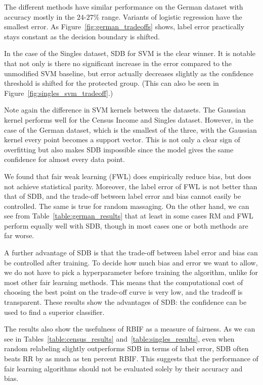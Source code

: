 \documentclass[conference]{IEEEtran}
\begin{document}
The different methods have similar performance on the German dataset with
accuracy mostly in the $24$-$27\%$ range. Variants of logistic regression have
the smallest error. As Figure~\ref{fig:german_tradeoffs} shows, label error
practically stays constant as the decision boundary is shifted.

In the case of the Singles dataset, SDB for SVM is the clear winner. It is
notable that not only is there no significant increase in the error compared to
the unmodified SVM baseline, but error actually decreases slightly as the
confidence threshold is shifted for the protected group. (This can also be seen
in Figure~\ref{fig:singles_svm_tradeoff}.)

Note again the difference in SVM kernels between the datasets.  The Gaussian
kernel performs well for the Census Income and Singles dataset.  However, in
the case of the German dataset, which is the smallest of the three, with the
Gaussian kernel every point becomes a support vector. This is not only a clear
sign of overfitting but also makes SDB impossible since the model gives the
same confidence for almost every data point.

We found that fair weak learning (FWL) does empirically reduce bias, but does
not achieve statistical parity.  Moreover, the label error of FWL is not better
than that of SDB, and the trade-off between label error and bias cannot easily
be controlled. The same is true for random massaging. On the other hand, we can
see from Table~\ref{table:german_results} that at least in some cases RM and
FWL perform equally well with SDB, though in most cases one or both methods are
far worse.

A further advantage of SDB is that the trade-off between label error and bias
can be controlled after training.  To decide how much bias and error we want to
allow, we do not have to pick a hyperparameter before training the algorithm,
unlike for most other fair learning methods. This means that the computational
cost of choosing the best point on the trade-off curve is very low, and the
tradeoff is transparent. These results show the advantages of SDB: the
confidence can be used to find a superior classifier.

The results also show the usefulness of RBIF as a measure of fairness.  As we
can see in Tables~\ref{table:census_results} and~\ref{table:singles_results},
even when random relabeling slightly outperforms SDB in terms of label error,
SDB often beats RR by as much as ten percent RBIF. This suggests that the
performance of fair learning algorithms should not be evaluated solely by their
accuracy and bias.
\end{document}
